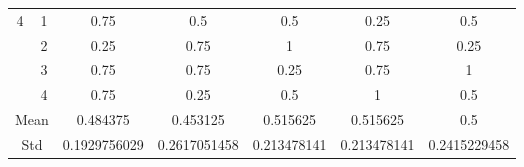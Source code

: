 \documentclass[draft,dvipsnames]{drexel-thesis}
\begin{document}
\begin{thesis}
\begin{table}[!t]
\begin{tabular}{|c|c|c|c|c|c|c|}
\multirow{4}{*}{4}    & 1                   & 0.75         & 0.5          & 0.5         & 0.25        & 0.5          \\ \cline{2-7} 
                      & 2                   & 0.25         & 0.75         & 1           & 0.75        & 0.25         \\ \cline{2-7} 
                      & 3                   & 0.75         & 0.75         & 0.25        & 0.75        & 1            \\ \cline{2-7} 
                      & 4                   & 0.75         & 0.25         & 0.5         & 1           & 0.5          \\ \hline
\multicolumn{2}{|c|}{Mean}                  & 0.484375     & 0.453125     & 0.515625    & 0.515625    & 0.5          \\ \hline
\multicolumn{2}{|c|}{Std}                   & 0.1929756029 & 0.2617051458 & 0.213478141 & 0.213478141 & 0.2415229458 \\ \hline
\end{tabular}
\end{table}


\end{thesis}
\end{document}
